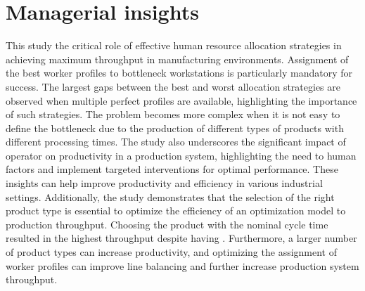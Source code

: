 \documentclass[review,12pt, 3p, times]{elsarticle}
\begin{document}
						       
					
\section{Managerial insights }\label{sec:mins}



This study  the critical role of effective human resource allocation strategies in achieving maximum throughput in manufacturing environments. Assignment of the best worker profiles to bottleneck workstations is particularly mandatory for success. The largest gaps between the best and worst allocation strategies are observed when multiple perfect profiles are available, highlighting the importance of such strategies. The problem becomes more complex when it is not easy to define the bottleneck  due to the production of different types of products with different processing times.  
The study also underscores the significant impact of operator  on productivity in a production system, highlighting the need to  human factors and implement targeted interventions for optimal performance. These insights can help improve productivity and efficiency in various industrial settings. Additionally, the study demonstrates that the selection of the right product type is essential to optimize the efficiency of an optimization model to  production throughput. Choosing the product with the   nominal cycle time  resulted in the highest throughput despite having . Furthermore, a larger number of product types can increase productivity, and optimizing the assignment of worker profiles can improve line balancing and further increase production system throughput. 
\end{document}

